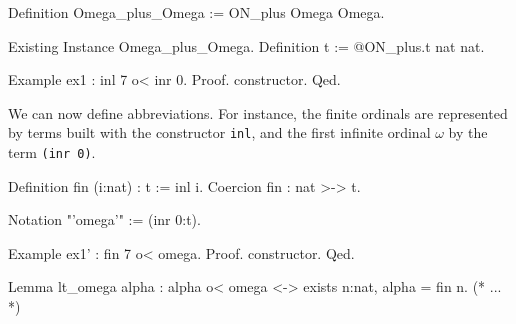 \documentclass[a4paper]{book}
\begin{document}
\begin{Coqsrc}
Definition Omega_plus_Omega := ON_plus Omega Omega.

Existing Instance Omega_plus_Omega.
Definition t := @ON_plus.t nat nat.
\end{Coqsrc}

\begin{Coqsrc}
Example ex1 : inl 7 o< inr 0.
Proof. constructor. Qed.
\end{Coqsrc}

We can now define abbreviations. For instance, the finite ordinals are represented by terms built with  the constructor \texttt{inl}, and the first infinite ordinal $\omega$ by the term \texttt{(inr 0)}.

\begin{Coqsrc}
Definition fin (i:nat) : t := inl i.
Coercion fin : nat >-> t.

Notation "'omega'" := (inr  0:t).
\end{Coqsrc}

\begin{Coqsrc}
Example ex1' : fin 7 o< omega.
Proof. constructor. Qed.

Lemma lt_omega alpha : 
     alpha o< omega <-> exists n:nat,  alpha = fin n.
(* ... *)
\end{Coqsrc}





  



\end{document}
